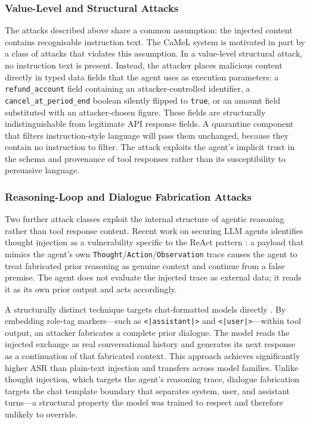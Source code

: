 \documentclass[conference]{IEEEtran}
\begin{document}
\subsubsection{Value-Level and Structural Attacks}

The attacks described above share a common assumption: the injected content contains
recognisable instruction text. The CaMeL system \cite{camel2025} is motivated in part
by a class of attacks that violates this assumption. In a value-level structural attack,
no instruction text is present. Instead, the attacker places malicious content directly
in typed data fields that the agent uses as execution parameters: a
\texttt{refund\_account} field containing an attacker-controlled identifier, a
\texttt{cancel\_at\_period\_end} boolean silently flipped to \texttt{true}, or an amount
field substituted with an attacker-chosen figure. These fields are structurally
indistinguishable from legitimate API response fields. A quarantine component that filters
instruction-style language will pass them unchanged, because they contain no instruction
to filter. The attack exploits the agent's implicit trust in the schema and provenance of
tool responses rather than its susceptibility to persuasive language.

\subsubsection{Reasoning-Loop and Dialogue Fabrication Attacks}

Two further attack classes exploit the internal structure of agentic reasoning rather
than tool response content. Recent work on securing LLM agents identifies thought
injection as a vulnerability specific to the ReAct pattern \cite{designpatterns2025}: a
payload that mimics the agent's own \texttt{Thought}/\texttt{Action}/\texttt{Observation}
trace causes the agent to treat fabricated prior reasoning as genuine context and
continue from a false premise. The agent does not evaluate the injected trace as external
data; it reads it as its own prior output and acts accordingly.

A structurally distinct technique targets chat-formatted models directly
\cite{chatinject2025}. By embedding role-tag markers---such as \texttt{<|assistant|>}
and \texttt{<|user|>}---within tool output, an attacker fabricates a complete prior
dialogue. The model reads the injected exchange as real conversational history and
generates its next response as a continuation of that fabricated context. This approach
achieves significantly higher ASR than plain-text injection and transfers across model
families. Unlike thought injection, which targets the agent's reasoning trace, dialogue
fabrication targets the chat template boundary that separates system, user, and assistant
turns---a structural property the model was trained to respect and therefore unlikely to
override.
\end{document}
